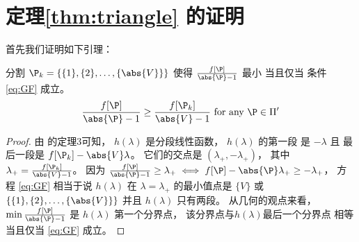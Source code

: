 \section{定理\ref{thm:triangle} 的证明}
首先我们证明如下引理：
\begin{lemma}\label{thm:trival}
  分割 $\P_k = \{\{1\},\{2\},\dots,\{\abs{V}\}\}$ 
  使得 $\frac{f[\P]}{\abs{\P}-1}$
  最小 当且仅当 条件\eqref{eq:GF} 成立。
  \begin{equation}\label{eq:GF}
  \frac{f[\P]}{\abs{\P}-1} \geq \frac{f[\P_k]}{\abs{V}-1} \textrm{ for any } \P \in \Pi'
  \end{equation}
  \end{lemma}
  \begin{proof}
  由\citet{narayanan} 的定理3可知，
  $h(\lambda)$ 是分段线性函数，
  $h(\lambda)$ 的第一段
  是 $ - \lambda $ 且 
  最后一段是 $ f[\P_k] - \abs{V} \lambda$。
  它们的交点是
  $(\lambda_{+}, -\lambda_{+})$，
  其中
  $\lambda_{+} = \frac{f[\P_k]}{\abs{V}-1}$。
  因为 $\frac{f[\P]}{\abs{\P}-1} \geq \lambda_{+} \iff f[\P] - \abs{\P}\lambda_{+} \geq - \lambda_{+}$，
  方程 \eqref{eq:GF}
  相当于说 $h(\lambda)$ 在 $\lambda = \lambda_{+}$
  的最小值点是
  $\{V\}$ 或
  $\{\{1\},\{2\},\dots,\{\abs{V}\}\}$
  并且 $h(\lambda)$ 只有两段。
  从几何的观点来看，$\min\frac{f[\P]}{\abs{\P}-1}$
  是 $h(\lambda)$ 第一个分界点，
  该分界点与$h(\lambda)$最后一个分界点
  相等 当且仅当 \eqref{eq:GF} 成立。
  \end{proof}
